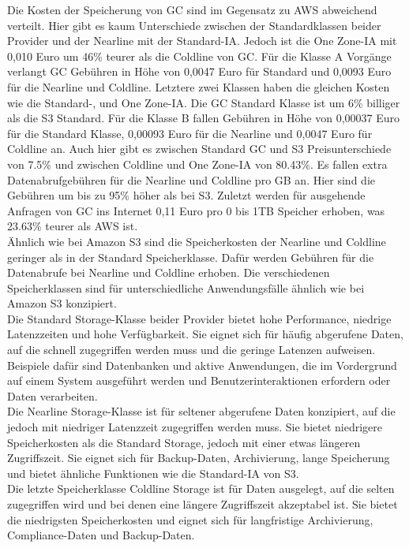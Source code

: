 Die Kosten der Speicherung von GC sind im Gegensatz zu AWS abweichend verteilt. Hier gibt es kaum Unterschiede zwischen der Standardklassen beider Provider und der Nearline mit der Standard-IA. Jedoch ist die One Zone-IA mit 0,010 Euro um 46\% teurer als die Coldline von GC. Für die Klasse A Vorgänge verlangt GC Gebühren in Höhe von 0,0047 Euro für Standard und 0,0093 Euro für die Nearline und Coldline. Letztere zwei Klassen haben die gleichen Kosten wie die Standard-, und One Zone-IA. Die GC Standard Klasse ist um 6\% billiger als die S3 Standard. Für die Klasse B fallen Gebühren in Höhe von 0,00037 Euro für die Standard Klasse, 0,00093 Euro für die Nearline und 0,0047 Euro für Coldline an. Auch hier gibt es zwischen Standard GC und S3 Preisunterschiede von 7.5\% und zwischen Coldline und One Zone-IA von 80.43\%. Es fallen extra Datenabrufgebühren für die Nearline und Coldline pro GB an. Hier sind die Gebühren um bis zu 95\% höher als bei S3. Zuletzt werden für ausgehende Anfragen von GC ins Internet 0,11 Euro pro 0 bis 1TB Speicher erhoben, was 23.63\% teurer als AWS ist.\\

Ähnlich wie bei Amazon S3 sind die Speicherkosten der Nearline und Coldline geringer als in der Standard Speicherklasse. Dafür werden Gebühren für die Datenabrufe bei Nearline und Coldline erhoben. Die verschiedenen Speicherklassen sind für unterschiedliche Anwendungsfälle ähnlich wie bei Amazon S3 konzipiert.\\

Die Standard Storage-Klasse beider Provider bietet hohe Performance, niedrige Latenzzeiten und hohe Verfügbarkeit. Sie eignet sich für häufig abgerufene Daten, auf die schnell zugegriffen werden muss und die geringe Latenzen aufweisen. Beispiele dafür sind Datenbanken und aktive Anwendungen, die im Vordergrund auf einem System ausgeführt werden und Benutzerinteraktionen erfordern oder Daten verarbeiten.\\ 

Die Nearline Storage-Klasse ist für seltener abgerufene Daten konzipiert, auf die jedoch mit niedriger Latenzzeit zugegriffen werden muss. Sie bietet niedrigere Speicherkosten als die Standard Storage, jedoch mit einer etwas längeren Zugriffszeit. Sie eignet sich für Backup-Daten, Archivierung, lange Speicherung und bietet ähnliche Funktionen wie die Standard-IA von S3.\\

Die letzte Speicherklasse Coldline Storage ist für Daten ausgelegt, auf die selten zugegriffen wird und bei denen eine längere Zugriffszeit akzeptabel ist. Sie bietet die niedrigsten Speicherkosten und eignet sich für langfristige Archivierung, Compliance-Daten und Backup-Daten.\\ 

